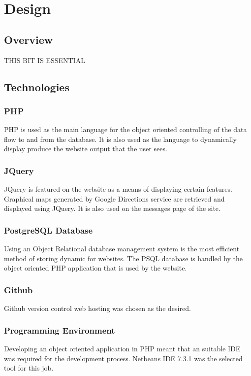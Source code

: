 \chapter{Design}

\section{Overview}
THIS BIT IS ESSENTIAL
\section{Technologies}
	\subsection{PHP}
		PHP is used as the main language for the object oriented controlling of the data flow to and from the database. It is also used as the language to dynamically display produce the website output that the user sees.
		
	\subsection{JQuery}
		JQuery is featured on the website as a means of displaying certain features. Graphical maps generated by Google Directions \cite{google_directions_api} service are retrieved and displayed using JQuery. It is also used on the messages page of the site.	
			
	\subsection{PostgreSQL Database}
	Using an Object Relational database management system is the most efficient method of storing dynamic for websites. The PSQL database is handled by the object oriented PHP application that is used by the website.
	
	\subsection{Github}
		Github \cite{github} version control web hosting was chosen as the desired.
		
	\subsection{Programming Environment}
		Developing an object oriented application in PHP meant that an suitable IDE was required for the development process. Netbeans IDE 7.3.1 was the selected tool for this job. 
		 
